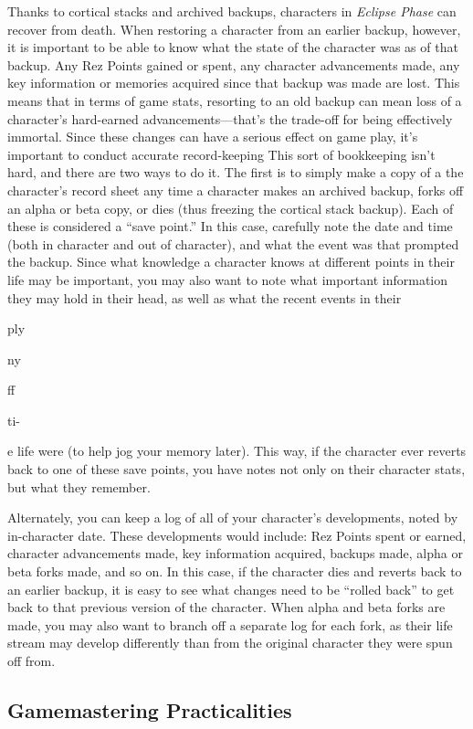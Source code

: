 Thanks to cortical stacks and archived backups, characters
in \textit{Eclipse Phase} can recover from death. When
restoring a character from an earlier backup, however, 
it is important to be able to know what the state of 
the character was as of that backup. Any Rez Points 
gained or spent, any character advancements made, 
any key information or memories acquired since that 
backup was made are lost. This means that in terms of 
game stats, resorting to an old backup can mean loss 
of a character's hard-earned advancements—that's the 
trade-off for being effectively immortal.
Since these changes can have a serious effect on 
game play, it's important to conduct accurate record-keeping
This sort of bookkeeping isn't hard, and
there are two ways to do it. The first is to simply 
make a copy of a the character's record sheet any 
time a character makes an archived backup, forks off 
an alpha or beta copy, or dies (thus freezing the cortical
stack backup). Each of these is considered a ``save
point.'' In this case, carefully note the date and time 
(both in character and out of character), and what 
the event was that prompted the backup. Since what 
knowledge a character knows at different points in 
their life may be important, you may also want to 
note what important information they may hold in 
their head, as well as what the recent events in their 

ply 

ny

ff

ti-

e
life were (to help jog your memory later). This way, 
if the character ever reverts back to one of these save 
points, you have notes not only on their character 
stats, but what they remember.

Alternately, you can keep a log of all of your 
character's developments, noted by in-character 
date. These developments would include: Rez Points 
spent or earned, character advancements made, key 
information acquired, backups made, alpha or beta 
forks made, and so on. In this case, if the character 
dies and reverts back to an earlier backup, it is easy 
to see what changes need to be ``rolled back'' to get 
back to that previous version of the character. When 
alpha and beta forks are made, you may also want to 
branch off a separate log for each fork, as their life 
stream may develop differently than from the original 
character they were spun off from.

\subsection{Gamemastering Practicalities}

